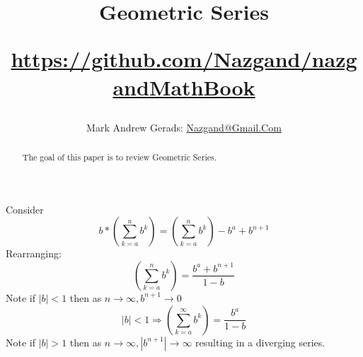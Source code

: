 \documentclass[]{article}
\author{Mark Andrew Gerads: \href{MailTo:Nazgand@Gmail.Com}{Nazgand@Gmail.Com}}
\title{
	Geometric Series
	
	\href{https://github.com/Nazgand/nazgandMathBook}{https://github.com/Nazgand/nazgandMathBook}
}
\newcommand{\pqty}[1]{{\left(#1\right)}}
\newcommand{\abs}[1]{{\left\lvert#1\right\rvert}}
\numberwithin{equation}{section}
\begin{document}
	
	\maketitle
	
	\begin{abstract}
		The goal of this paper is to review Geometric Series.
	\end{abstract}
	
	Consider
	\begin{equation}
		b*\pqty{\sum_{k=a}^{n} b^k}
		=\pqty{\sum_{k=a}^{n} b^k}-b^a+b^{n+1}
	\end{equation}
	Rearranging:
	\begin{equation}
	\pqty{\sum_{k=a}^{n} b^k}
	=\frac{b^a+b^{n+1}}{1-b}
	\end{equation}
	Note if \(\abs{b}<1\) then as \(n\to\infty, b^{n+1}\to 0\)
	\begin{equation}
	\label{GeometricSeries}
	\abs{b}<1\Rightarrow
	\pqty{\sum_{k=a}^{\infty} b^k}
	=\frac{b^a}{1-b}
	\end{equation}
	Note if \(\abs{b}>1\) then as \(n\to\infty, \abs{b^{n+1}}\to \infty\) resulting in a diverging series.
\end{document}
